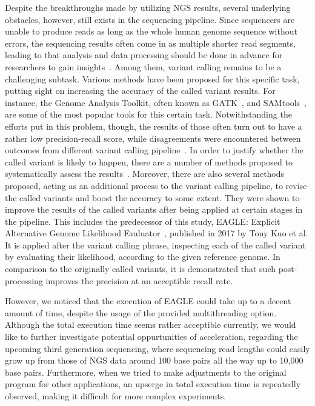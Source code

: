 \documentclass{PHlab-thesis}
\begin{document}
Despite the breakthroughs made by utilizing NGS results, several underlying obstacles, however, still exists in the sequencing pipeline. Since sequencers are unable to produce reads as long as the whole human genome sequence without errors, the sequencing results often come in as multiple shorter read segments, leading to that analysis and data processing should be done in advance for researchers to gain insights~\cite{muzzey2015understanding}. Among them, variant calling remains to be a challenging subtask. Various methods have been proposed for this specific task, putting sight on increasing the accuracy of the called variant results. For instance, the Genome Analysis Toolkit, often known as GATK~\cite{mckenna2010genome}, and SAMtools~\cite{li2009sequence}, are some of the most popular tools for this certain task. Notwithstanding the efforts put in this problem, though, the results of those often turn out to have a rather low  precision-recall score, while disagreements were encountered between outcomes from different variant calling pipeline~\cite{o2013low}. In order to justify whether the called variant is likely to happen, there are a number of methods proposed to systematically assess the results~\cite{hwang2015systematic,yu2013comparing}. Moreover, there are also several methods proposed, acting as an additional process to the variant calling pipeline, to revise the called variants and boost the accuracy to some extent. They were shown to improve the results of the called variants after being applied at certain stages in the pipeline. This includes the predecessor of this study, EAGLE: Explicit Alternative Genome Likelihood Evaluator~\cite{kuo2018eagle}, published in 2017 by Tony Kuo et al. It is applied after the variant calling phrase, inspecting each of the called variant by evaluating their likelihood, according to the given reference genome. In comparison to the originally called variants, it is demonstrated that such post-processing improves the precision at an acceptible recall rate.

However, we noticed that the execution of EAGLE could take up to a decent amount of time, despite the usage of the provided multithreading option. Although the total execution time seems rather acceptible currently, we would like to further investigate potential oppurtunities of acceleration, regarding the upcoming third generation sequencing, where sequencing read lengths could easily grow up from those of NGS data around 100 base pairs all the way up to 10,000 base pairs. Furthermore, when we tried to make adjustments to the original program for other applications, an upserge in total execution time is repeatedly observed, making it difficult for more complex experiments.
\end{document}
